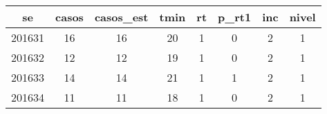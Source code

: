 \begin{tabular}{c|ccccccc}
  \hline
se & casos & casos\_est & tmin & rt & p\_rt1 & inc & nivel \\ 
  \hline
201631 & 16 & 16 & 20 & 1 & 0 & 2 & 1 \\ 
  201632 & 12 & 12 & 19 & 1 & 0 & 2 & 1 \\ 
  201633 & 14 & 14 & 21 & 1 & 1 & 2 & 1 \\ 
  201634 & 11 & 11 & 18 & 1 & 0 & 2 & 1 \\ 
   \hline
\end{tabular}
